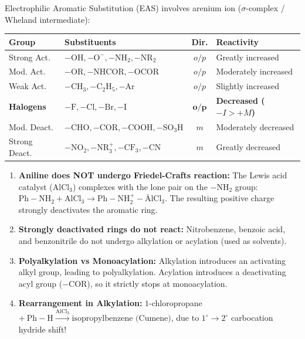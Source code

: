 \documentclass[10pt,twoside,openright]{book}
\begin{document}
\begin{conceptbox}
Electrophilic Aromatic Substitution (EAS) involves arenium ion ($\sigma$-complex / Wheland intermediate):
\begin{center}
{\fontsize{7.5pt}{9.0pt}\selectfont\setlength{\tabcolsep}{1.5pt}
\begin{tabularx}{\linewidth}{|l|>{\RaggedRight}X|c|>{\RaggedRight}X|}
\hline
\textbf{Group} & \textbf{Substituents} & \textbf{Dir.} & \textbf{Reactivity} \\
\hline
Strong Act. & $-\mathrm{OH}, -\mathrm{O}^-, -\mathrm{NH}_2, -\mathrm{NR}_2$ & $o/p$ & Greatly increased \\
Mod. Act. & $-\mathrm{OR}, -\mathrm{NHCOR}, -\mathrm{OCOR}$ & $o/p$ & Moderately increased \\
Weak Act. & $-\mathrm{CH}_3, -\mathrm{C_2H_5}, -\mathrm{Ar}$ & $o/p$ & Slightly increased \\
\textbf{Halogens} & $-\mathrm{F}, -\mathrm{Cl}, -\mathrm{Br}, -\mathrm{I}$ & $\mathbf{o/p}$ & \textbf{Decreased ($-I > +M$)} \\
Mod. Deact. & $-\mathrm{CHO}, -\mathrm{COR}, -\mathrm{COOH}, -\mathrm{SO_3H}$ & $m$ & Moderately decreased \\
Strong Deact. & $-\mathrm{NO}_2, -\mathrm{NR}_3^+, -\mathrm{CF}_3, -\mathrm{CN}$ & $m$ & Greatly decreased \\
\hline
\end{tabularx}}
\end{center}
\end{conceptbox}

\begin{trapbox}
\begin{enumerate}[leftmargin=*]
  \item \textbf{Aniline does NOT undergo Friedel-Crafts reaction:} The Lewis acid catalyst ($\mathrm{AlCl}_3$) complexes with the lone pair on the $-\mathrm{NH}_2$ group: $\mathrm{Ph-NH_2} + \mathrm{AlCl_3} \to \mathrm{Ph-NH_2^+-\bar{A}lCl_3}$. The resulting positive charge strongly deactivates the aromatic ring.
  \item \textbf{Strongly deactivated rings do not react:} Nitrobenzene, benzoic acid, and benzonitrile do not undergo alkylation or acylation (used as solvents).
  \item \textbf{Polyalkylation vs Monoacylation:} Alkylation introduces an activating alkyl group, leading to polyalkylation. Acylation introduces a deactivating acyl group ($-\mathrm{COR}$), so it strictly stops at monoacylation.
  \item \textbf{Rearrangement in Alkylation:} $1$-chloropropane $+\ \mathrm{Ph-H} \xrightarrow{\mathrm{AlCl_3}} \text{isopropylbenzene (Cumene)}$, due to $1^\circ \to 2^\circ$ carbocation hydride shift!
\end{enumerate}
\end{trapbox}
\end{document}
